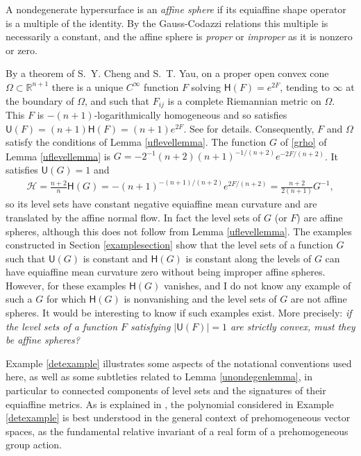 \documentclass [leqno, 10pt]{amsart}
\theoremstyle{definition}
\numberwithin{equation}{section}
\newcommand{\amc}{\mathcal{H}}
\newcommand{\Om}{\Omega}
\newcommand{\U}{\mathsf{U}}
\renewcommand{\H}{\mathsf{H}}
\newcommand{\cinf}{C^{\infty}}
\newcommand{\rea}{\mathbb R}
\begin{document}
\begin{remark}\label{canonicalpotentialremark}
A nondegenerate hypersurface is an \textit{affine sphere} if its equiaffine shape operator is a multiple of the identity. By the Gauss-Codazzi relations this multiple is necessarily a constant, and the affine sphere is \textit{proper} or \textit{improper} as it is nonzero or zero. 

By a theorem of S.~Y. Cheng and S.~T. Yau, on a proper open convex cone $\Om \subset \rea^{n+1}$ there is a unique $\cinf$ function $F$ solving $\H(F) = e^{2F}$, tending to $\infty$ at the boundary of $\Om$, and such that $F_{ij}$ is a complete Riemannian metric on $\Om$. This $F$ is $-(n+1)$-logarithmically homogeneous and so satisfies $\U(F) = (n+1)\H(F) = (n+1)e^{2F}$. See \cite{Fox-schwarz} for details. Consequently, $F$ and $\Om$ satisfy the conditions of Lemma \ref{uflevellemma}. The function $G$ of \eqref{grho} of Lemma \ref{uflevellemma} is $G = -2^{-1}(n+2)(n+1)^{-1/(n+2)}e^{-2F/(n+2)}$. It satisfies $\U(G) = 1$ and 
\begin{align}
\amc = \tfrac{n+2}{n}\H(G) = -(n+1)^{-(n+1)/(n+2)}e^{2F/(n+2)} = \tfrac{n+2}{2(n+1)}G^{-1},
\end{align} 
so its level sets have constant negative equiaffine mean curvature and are translated by the affine normal flow. In fact the level sets of $G$ (or $F$) are affine spheres, although this does not follow from Lemma \ref{uflevellemma}. The examples constructed in Section \ref{examplesection} show that the level sets of a function $G$ such that $\U(G)$ is constant and $\H(G)$ is constant along the levels of $G$ can have equiaffine mean curvature zero without being improper affine spheres. However, for these examples $\H(G)$ vanishes, and I do not know any example of such a $G$ for which $\H(G)$ is nonvanishing and the level sets of $G$ are not affine spheres. It would be interesting to know if such examples exist. More precisely:
\textit{if the level sets of a function $F$ satisfying $|\U(F)| = 1$ are strictly convex, must they be affine spheres?}
\end{remark}

Example \ref{detexample} illustrates some aspects of the notational conventions used here, as well as some subtleties related to Lemma \ref{unondegenlemma}, in particular to connected components of level sets and the signatures of their equiaffine metrics. As is explained in \cite{Fox-prehom}, the polynomial considered in Example \ref{detexample} is best understood in the general context of prehomogeneous vector spaces, as the fundamental relative invariant of a real form of a prehomogeneous group action.
\end{document}
